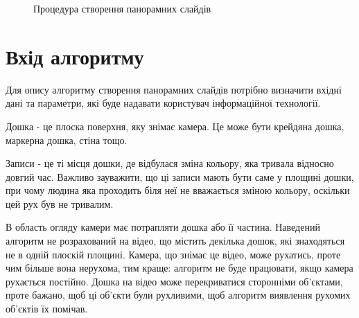 \usetikzlibrary{arrows,positioning,shapes}
\begin{figure}
\begin{center}
\end{center}
\caption{Процедура створення панорамних слайдів
\label{fig:pipeline}
}
\end{figure}

\section{Вхід алгоритму}

Для опису алгоритму створення панорамних слайдів потрібно визначити 
вхідні дані та параметри, які буде надавати користувач інформаційної
технології.

Дошка - це плоска поверхня, яку знімає камера. Це може бути крейдяна 
дошка, маркерна дошка, стіна тощо.

Записи - це ті місця дошки, де відбулася зміна кольору, яка тривала 
відносно довгий час. Важливо зауважити, що ці записи мають бути 
саме у площині дошки, при чому людина яка проходить біля неї не вважається
зміною кольору, оскільки цей рух був не тривалим.

В область огляду камери має потрапляти дошка або її частина. Наведений 
алгоритм не розрахований на відео, що містить декілька дошок, які знаходяться
не в одній плоскій площині. Камера, що знімає це відео, може рухатись, проте 
чим більше вона нерухома, тим краще: алгоритм не буде працювати, якщо камера 
рухається постійно. Дошка на відео може перекриватися сторонніми об'єктами, 
проте бажано, щоб ці об'єкти були рухливими, щоб алгоритм виявлення рухомих 
об'єктів їх помічав.

